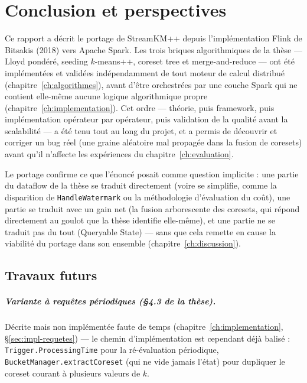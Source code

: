\chapter{Conclusion et perspectives}
\label{ch:conclusion}

Ce rapport a décrit le portage de StreamKM++ depuis l'implémentation Flink
de Bitsakis (2018) vers Apache Spark. Les trois briques algorithmiques de la
thèse --- Lloyd pondéré, seeding $k$-means++, coreset tree et
merge-and-reduce --- ont été implémentées et validées indépendamment de tout
moteur de calcul distribué (chapitre~\ref{ch:algorithmes}), avant d'être
orchestrées par une couche Spark qui ne contient elle-même aucune logique
algorithmique propre (chapitre~\ref{ch:implementation}). Cet ordre --- théorie,
puis framework, puis implémentation opérateur par opérateur, puis validation
de la qualité avant la scalabilité --- a été tenu tout au long du projet, et
a permis de découvrir et corriger un bug réel (une graine aléatoire mal
propagée dans la fusion de coresets) avant qu'il n'affecte les expériences
du chapitre~\ref{ch:evaluation}.

Le portage confirme ce que l'énoncé posait comme question implicite : une
partie du dataflow de la thèse se traduit directement (voire se simplifie,
comme la disparition de \texttt{HandleWatermark} ou la méthodologie
d'évaluation du coût), une partie se traduit avec un gain net (la fusion
arborescente des coresets, qui répond directement au goulot que la thèse
identifie elle-même), et une partie ne se traduit pas du tout (Queryable
State) --- sans que cela remette en cause la viabilité du portage dans son
ensemble (chapitre~\ref{ch:discussion}).

\section{Travaux futurs}

\paragraph{Variante à requêtes périodiques (§4.3 de la thèse).} Décrite mais
non implémentée faute de temps (chapitre~\ref{ch:implementation},
§\ref{sec:impl-requetes}) --- le chemin d'implémentation est cependant déjà
balisé : \texttt{Trigger.ProcessingTime} pour la ré-évaluation périodique,
\texttt{BucketManager.extractCoreset} (qui ne vide jamais l'état) pour
dupliquer le coreset courant à plusieurs valeurs de $k$.

